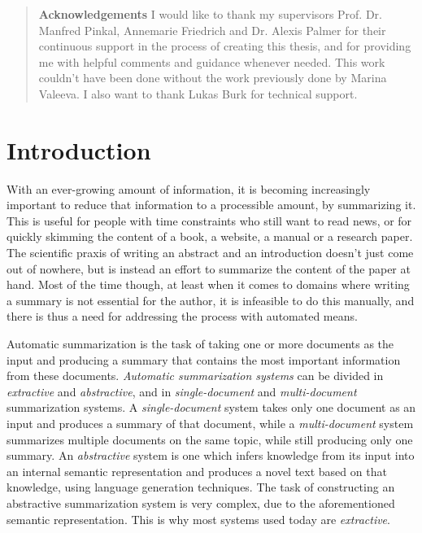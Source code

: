 \documentclass[a4paper,10pt]{scrartcl}
\theoremstyle{style}
\begin{document}
\begin{abstract}
\setlength{\parskip}{2ex plus 0.5ex minus 0.2ex}
\textbf{Acknowledgements} \quad I would like to thank my supervisors Prof. Dr. Manfred Pinkal, Annemarie Friedrich and Dr. Alexis Palmer for their continuous support in the process of creating this thesis, and for providing me with helpful comments and guidance whenever needed. This work couldn't have been done without the work previously done by Marina Valeeva. I also want to thank Lukas Burk for technical support.
\end{abstract}

\newpage

\thispagestyle{empty}
\tableofcontents
\newpage

\setcounter{page}{1}		%
\newpage

\maketableofcontents

\section{Introduction}
With an ever-growing amount of information, it is becoming increasingly important to reduce that information to a processible amount, by summarizing it. This is useful for people with time constraints who still want to read news, or for quickly skimming the content of a book, a website, a manual or a research paper. The scientific praxis of writing an abstract and an introduction doesn't just come out of nowhere, but is instead an effort to summarize the content of the paper at hand.
Most of the time though, at least when it comes to domains where writing a summary is not essential for the author, it is infeasible to do this manually, and there is thus a need for addressing the process with automated means.

Automatic summarization is the task of taking one or more documents as the input and producing a summary that contains the most important information from these documents.
\textit{Automatic summarization systems} can be divided in \textit{extractive} and \textit{abstractive}, and in \textit{single-document} and \textit{multi-document} summarization systems.
A \textit{single-document} system takes only one document as an input and produces a summary of that document, while a \textit{multi-document} system summarizes multiple documents on the same topic, while still producing only one summary.
An \textit{abstractive} system is one which infers knowledge from its input into an internal semantic representation and produces a novel text based on that knowledge, using language generation techniques. The task of constructing an abstractive summarization system is very complex, due to the aforementioned semantic representation. This is why most systems used today are \textit{extractive}.
\end{document}
